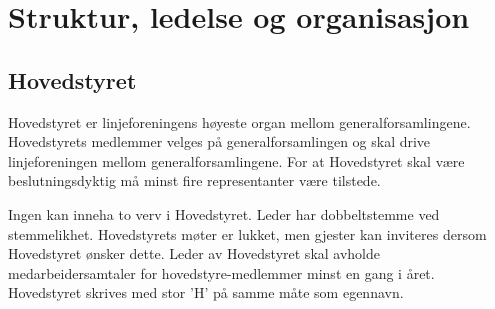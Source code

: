 \chapter{Struktur, ledelse og organisasjon}
\section{Hovedstyret}
Hovedstyret er linjeforeningens høyeste organ mellom generalforsamlingene. Hovedstyrets medlemmer velges på generalforsamlingen og skal drive linjeforeningen mellom generalforsamlingene. For at Hovedstyret skal være beslutningsdyktig må minst fire representanter være tilstede. \newline

Ingen kan inneha to verv i Hovedstyret. Leder har dobbeltstemme ved stemmelikhet. Hovedstyrets møter er lukket, men gjester kan inviteres dersom Hovedstyret ønsker \linebreak dette. Leder av Hovedstyret skal avholde medarbeidersamtaler for hovedstyre-\linebreak medlemmer minst en gang i året. Hovedstyret skrives med stor 'H' på samme måte som egennavn.



